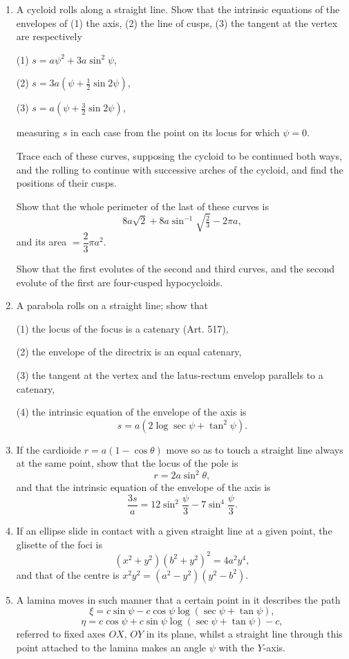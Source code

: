 \documentclass[11pt, a4paper]{article}
\begin{document}
\begin{enumerate}[leftmargin=2em]
\item A cycloid rolls along a straight line. Show that the intrinsic equations of the envelopes of (1) the axis, (2) the line of cusps, (3) the tangent at the vertex are respectively

(1) $s=a\psi^2+3a\sin^2\psi$,

(2) $s=3a(\psi+\tfrac12\sin2\psi)$,

(3) $s=a(\psi+\tfrac32\sin2\psi)$,

measuring $s$ in each case from the point on its locus for which $\psi=0$.

Trace each of these curves, supposing the cycloid to be continued both ways, and the rolling to continue with successive arches of the cycloid, and find the positions of their cusps.

Show that the whole perimeter of the last of these curves is
\[
8a\sqrt2+8a\sin^{-1}\sqrt{\tfrac23}-2\pi a,
\]
and its area $=\dfrac23\pi a^2$.

Show that the first evolutes of the second and third curves, and the second evolute of the first are four-cusped hypocycloids.

\item A parabola rolls on a straight line; show that

(1) the locus of the focus is a catenary (Art. 517),

(2) the envelope of the directrix is an equal catenary,

(3) the tangent at the vertex and the latus-rectum envelop parallels to a catenary,

(4) the intrinsic equation of the envelope of the axis is
\[
s=a(2\log\sec\psi+\tan^2\psi).
\]

\item If the cardioide $r=a(1-\cos\theta)$ move so as to touch a straight line always at the same point, show that the locus of the pole is
\[
r=2a\sin^2\theta,
\]
and that the intrinsic equation of the envelope of the axis is
\[
\frac{3s}{a}=12\sin^2\frac{\psi}{3}-7\sin^4\frac{\psi}{3}.
\]

\item If an ellipse slide in contact with a given straight line at a given point, the glisette of the foci is
\[
(x^2+y^2)(b^2+y^2)^2=4a^2y^4,
\]
and that of the centre is $x^2y^2=(a^2-y^2)(y^2-b^2)$.

\item A lamina moves in such manner that a certain point in it describes the path
\[
\xi=c\sin\psi-c\cos\psi\log(\sec\psi+\tan\psi),
\]
\[
\eta=c\cos\psi+c\sin\psi\log(\sec\psi+\tan\psi)-c,
\]
referred to fixed axes $OX$, $OY$ in its plane, whilst a straight line through this point attached to the lamina makes an angle $\psi$ with the $Y$-axis.


\end{enumerate}
\end{document}
